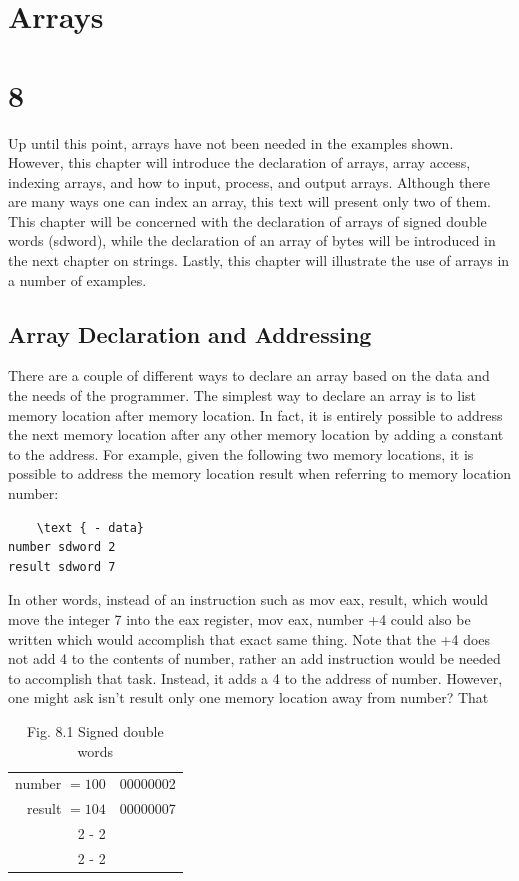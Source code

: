 \documentclass[10pt]{article}
\begin{document}
\section*{Arrays}
\section*{8}
Up until this point, arrays have not been needed in the examples shown. However, this chapter will introduce the declaration of arrays, array access, indexing arrays, and how to input, process, and output arrays. Although there are many ways one can index an array, this text will present only two of them. This chapter will be concerned with the declaration of arrays of signed double words (sdword), while the declaration of an array of bytes will be introduced in the next chapter on strings. Lastly, this chapter will illustrate the use of arrays in a number of examples.

\subsection*{Array Declaration and Addressing}
There are a couple of different ways to declare an array based on the data and the needs of the programmer. The simplest way to declare an array is to list memory location after memory location. In fact, it is entirely possible to address the next memory location after any other memory location by adding a constant to the address. For example, given the following two memory locations, it is possible to address the memory location result when referring to memory location number:

\begin{verbatim}
    \text { - data}
number sdword 2
result sdword 7
\end{verbatim}

In other words, instead of an instruction such as mov eax, result, which would move the integer 7 into the eax register, mov eax, number +4 could also be written which would accomplish that exact same thing. Note that the +4 does not add 4 to the contents of number, rather an add instruction would be needed to accomplish that task. Instead, it adds a 4 to the address of number. However, one might ask isn't result only one memory location away from number? That

\begin{table}[h]
\begin{center}
\begin{tabular}{r|r|}
number $=100$ & 00000002 \\
result $=104$ & 00000007 \\
\cline { 2 - 2 }
 &  \\
\cline { 2 - 2 }
\end{tabular}
\captionsetup{labelformat=empty}
\caption{Fig. 8.1 Signed double words}
\end{center}
\end{table}
\end{document}
